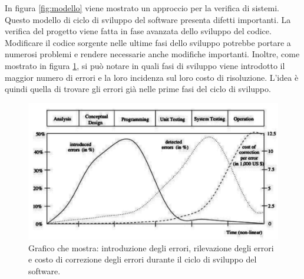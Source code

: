 In figura \ref{fig:modello} viene mostrato un approccio per la verifica di sistemi. Questo modello di ciclo di sviluppo del software presenta difetti importanti. La verifica del progetto viene fatta in fase avanzata dello sviluppo del codice. Modificare il codice sorgente nelle ultime fasi dello sviluppo potrebbe portare a numerosi problemi e rendere necessarie anche modifiche importanti. Inoltre, come mostrato in figura \ref{fig:costo_errori}, si può notare in quali fasi di sviluppo viene introdotto il maggior numero di errori e la loro incidenza sul loro costo di risoluzione. L'idea è quindi quella di trovare gli errori già nelle prime fasi del ciclo di sviluppo.

\begin{figure}[ht]
\begin{center}
\includegraphics[scale=0.45]{img/costo_errori.png}
\caption{Grafico che mostra: introduzione degli errori, rilevazione degli errori e costo di correzione degli errori durante il ciclo di sviluppo del software.}
\label{fig:costo_errori}
\end{center}
\end{figure}